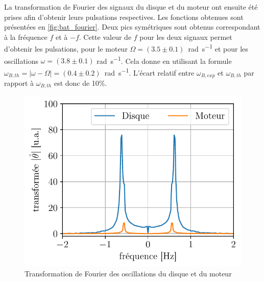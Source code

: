 La transformation de Fourier des signaux du disque et du moteur ont ensuite été prises afin d'obtenir leurs pulsations respectives. Les fonctions obtenues sont présentées en \autoref{fig:bat_fourier}. Deux pics symétriques sont obtenus correspondant à la fréquence $f$ et à $-f$. Cette valeur de $f$ pour les deux signaux permet d'obtenir les pulsations, pour le moteur \hbox{$\Omega = (3.5\pm0.1)$ \si{\radian\per\second}} et pour les oscillations $\omega = (3.8 \pm 0.1)$ \si{\radian\per\second}. Cela donne en utilisant la formule \hbox{\(\omega_{B,th} = |\omega- \Omega| = (0.4\pm0.2)\) \si{\radian\per\second}}. L'écart relatif entre $\omega_{B,exp}$ et $\omega_{B,th}$ par rapport à $\omega_{B,th}$ est donc de 10\%.
\begin{figure}
    \vspace*{-0.5cm}
    \centering
    \includegraphics[width=\linewidth]{figures/bat_fourier.pdf}
    \caption{Transformation de Fourier des oscillations du disque et du moteur}
    \label{fig:bat_fourier}
    \vspace*{-0.2cm}
\end{figure}


